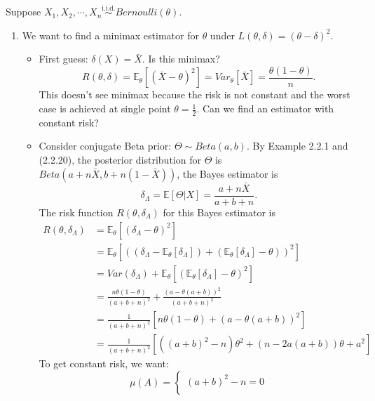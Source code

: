 \documentclass[a4paper]{article}
\begin{document}
\begin{eg}
	Suppose $X_1, X_2, \cdots, X_n \stackrel{\text{i.i.d.}}{\sim} Bernoulli(\theta)$. 
	\begin{enumerate}
		\item We want to find a minimax estimator for $\theta$ under $L(\theta,\delta) = (\theta - \delta)^2$.
			\begin{itemize}
			\item First guess: $\delta(X) = \bar{X}$. Is this minimax?
			\begin{equation*}
				R(\theta,\delta) = \mathbb{E}_\theta[(\bar{X} - \theta)^2] = Var_\theta[\bar{X}] = \frac{\theta(1-\theta)}{n}.
			\end{equation*}
			This doesn't see minimax because the risk is not constant and the worst case is achieved at single point $\theta = \frac{1}{2}$. Can we find an estimator with constant risk?
			\item Consider conjugate Beta prior: $\Theta \sim Beta(a,b)$. By Example 2.2.1 and (2.2.20), the posterior distribution for $\Theta$ is $Beta(a+n\bar{X},b+n(1-\bar{X}))$, the Bayes estimator is 
			\begin{equation}
				\delta_{\Lambda} = \mathbb{E}[\Theta | X] = \frac{a+n\bar{X}}{a+b+n}.
			\end{equation}
			The risk function $R(\theta,\delta_{\Lambda})$ for this Bayes estimator is
			\begin{equation}
				\begin{aligned}
					R(\theta,\delta_{\Lambda}) &= \mathbb{E}_\theta[(\delta_{\Lambda} - \theta)^2] \\
					&= \mathbb{E}_\theta[((\delta_{\Lambda} - \mathbb{E}_\theta[\delta_{\Lambda}]) + (\mathbb{E}_\theta[\delta_{\Lambda}] - \theta))^2] \\
					&= Var(\delta_{\Lambda}) + \mathbb{E}_\theta[(\mathbb{E}_\theta[\delta_{\Lambda}] - \theta)^2] \\
					&= \frac{n\theta(1-\theta)}{(a+b+n)^2} + \frac{(a - \theta(a+b))^2}{(a+b+n)^2} \\
					&= \frac{1}{(a+b+n)^2}[n\theta(1-\theta)+(a - \theta(a+b))^2] \\
					&= \frac{1}{(a+b+n)^2}[((a+b)^2-n)\theta^2 + (n-2a(a+b))\theta + a^2]
				\end{aligned}
			\end{equation}
			To get constant risk, we want:
			\begin{equation*}
				\mu (A) =\left\{ 
				\begin{array}{l}
					(a+b)^2-n = 0 \\

\end{array}
\end{equation*}
\end{itemize}
\end{enumerate}
\end{eg}
\end{document}
